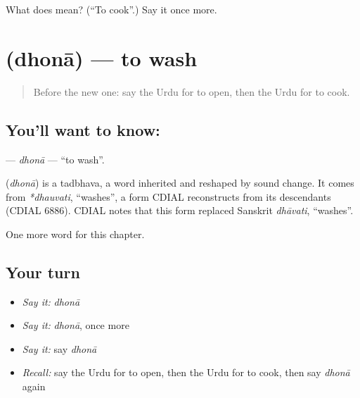 \begin{tcolorbox}[breakable,colback=teal!4,colframe=teal!35!black,title={Before you move on}]
What does  mean? (\textquotedblleft{}To cook\textquotedblright{}.) Say it once more.
\end{tcolorbox}
\section[\texorpdfstring{\ur{دھونا} (dhonā)}{دھونا (dhonā)}]{ (dhonā) — to wash}

\label{lesson:UR-C49-dhona}



\begin{quote}
Before the new one: say the Urdu for to open, then the Urdu for to cook.
\end{quote}

\subsection*{You'll want to know: }
\textbf{} — \emph{dhonā} — \textquotedblleft{}to wash\textquotedblright{}.

\begin{cousinweb}
\textbf{} (\emph{dhonā}) is a tadbhava, a word inherited and reshaped by sound change. It comes from \emph{*dhauvati}, \textquotedblleft{}washes\textquotedblright{}, a form CDIAL reconstructs from its descendants (CDIAL 6886). CDIAL notes that this form replaced Sanskrit \emph{dhāvati}, \textquotedblleft{}washes\textquotedblright{}.
\end{cousinweb}

\begin{grammarlens}[title={What you've built}]
One more word for this chapter.
\end{grammarlens}

\subsection*{Your turn}
\begin{itemize}
\raggedright
  \item \emph{Say it:} \emph{dhonā}
  \item \emph{Say it:} \emph{dhonā}, once more
  \item \emph{Say it:} say \emph{dhonā}
  \item \emph{Recall:} say the Urdu for to open, then the Urdu for to cook, then say \emph{dhonā} again
\end{itemize}

